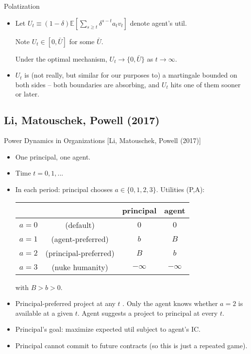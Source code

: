 \documentclass[english,10pt
,aspectratio=169
]{beamer}
\begin{document}
\begin{frame}{Polatization}
\begin{itemize}
	\item Let $U_t \equiv (1-\delta) \mathbb{E} \left[\sum_{s \geq t} \delta^{s-t} a_t v_t\right]$ denote agent's util. 
	
	Note $U_t \in \left[0,\bar{U}\right]$ for some $\bar{U}$.
	
	\begin{theorem}[Polarisation]
		Under the optimal mechanism, $U_t \to \{0, \bar{U}\}$ as $t \to \infty$.
	\end{theorem}
	
	\item $U_t$ is (not really, but similar for our purposes to) a martingale bounded on both sides -- both boundaries are absorbing, and $U_t$ hits one of them sooner or later.
\end{itemize}
\end{frame}


\subsection{Li, Matouschek, Powell (2017)}

\begin{frame}{Power Dynamics in Organizations [Li, Matouschek, Powell (2017)]}
\begin{itemize}
	\item One principal, one agent.
	\item Time $t=0,1,...$
	\item In each period: principal chooses $a \in \{0,1,2,3\}$. Utilities (P,A):
	\medskip
	\begin{center}
		\begin{tabular}{c c | c | c |}
			& & principal 	& agent \\ \hline
			$a=0$ & (default)	& $0$ 	& $0$	\\ \hline
			$a=1$ & (agent-preferred)	& $b$ 	& $B$	\\ \hline
			$a=2$ & (principal-preferred)	& $B$ 	& $b$	\\ \hline
			$a=3$ & (nuke humanity)	& $-\infty$	& $-\infty$ \\ \hline
		\end{tabular}
	\end{center}
	\medskip
	with $B > b > 0$.
	\item Principal-preferred project  at any $t$ . Only the agent knows whether $a=2$ is available at a given $t$. Agent suggests a project to principal at every $t$.
	\item Principal's goal: maximize expected util subject to agent's IC.
	\item Principal \alert{cannot commit} to future contracts (so this is just a repeated game).
\end{itemize}
\end{frame}
\end{document}
